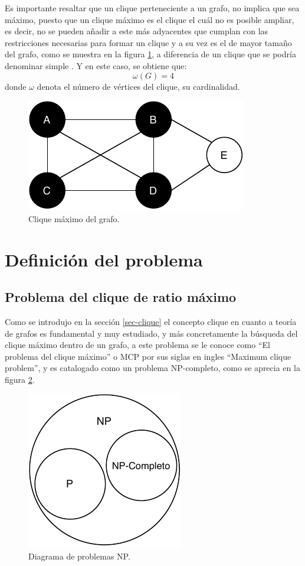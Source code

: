 Es importante resaltar que un clique perteneciente a un grafo, no implica que sea máximo, puesto que un clique máximo es el clique el cuál no es posible ampliar, es decir, no se pueden añadir a este más adyacentes que cumplan con las restricciones necesarias para formar un clique y a su vez es el de mayor tamaño del grafo, como se muestra en la figura \ref{fig:max-clique}, a diferencia de un clique que se podría denominar simple  \cite{web-maximalclique}\cite{web-maximumclique}. Y en este  caso, se obtiene que:
\[
\omega(G) = 4
\]
donde $\omega$ denota el número de vértices del clique, su cardinalidad.
\begin{figure}[H]
	\centering
	\includegraphics{Figures/graph-clique-max.pdf}
	\caption{Clique máximo del grafo.}
	\label{fig:max-clique}
\end{figure}

\section{Definición del problema}

\subsection{Problema del clique de ratio máximo}
\label{intro-problema}
Como se introdujo en la sección \ref{sec-clique} el concepto clique en cuanto a teoría de grafos es fundamental y muy estudiado, y más concretamente la búsqueda del clique máximo dentro de un grafo, a este problema se le conoce como ``El problema del clique máximo'' o \gls{MCP} por sus siglas en ingles ``Maximum clique problem'', y es catalogado como un problema NP-completo, como se aprecia en la figura \ref{fig:problemas-np}.

\begin{figure}[H]
	\centering
	\includegraphics{Figures/problemas-np.pdf}
	\caption{Diagrama de problemas NP.}
	\label{fig:problemas-np}
\end{figure}

